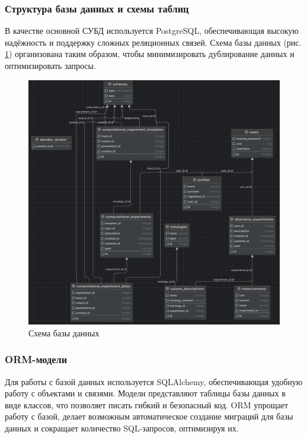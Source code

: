 \subsubsection{Структура базы данных и схемы таблиц}

В качестве основной СУБД используется PostgreSQL, обеспечивающая высокую надёжность и поддержку сложных реляционных связей. Схема базы данных (рис. \ref{pic:postgres_scheme}) организована таким образом, чтобы минимизировать дублирование данных и оптимизировать запросы.

\begin{figure}[H]
    \centering
    \includegraphics[width=\linewidth]{img/postgres_scheme.png}
    \caption{Схема базы данных}
    \label{pic:postgres_scheme}
\end{figure}
\vspace{0.5cm}

\subsubsection{ORM-модели}

Для работы с базой данных используется SQLAlchemy, обеспечивающая удобную работу с объектами и связями. Модели представляют таблицы базы данных в виде классов, что позволяет писать гибкий и безопасный код. ORM упрощает работу с базой, делает возможным автоматическое создание миграций для базы данных и сокращает количество SQL-запросов, оптимизируя их.

